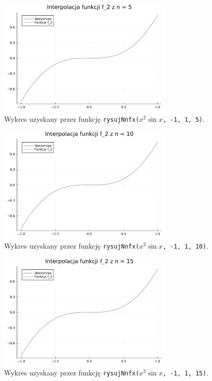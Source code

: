 \documentclass{article}
\begin{document}
\begin{figure}[H]
\centering
\includegraphics[width=0.75\textwidth]{task5_f2_n5.png}
\caption{Wykres uzyskany przez funkcję \texttt{rysujNnfx($x^2 \sin x$, -1, 1, 5)}.}
\end{figure}

\begin{figure}[H]
\centering
\includegraphics[width=0.75\textwidth]{task5_f2_n10.png}
\caption{Wykres uzyskany przez funkcję \texttt{rysujNnfx($x^2 \sin x$, -1, 1, 10)}.}
\end{figure}

\begin{figure}[H]
\centering
\includegraphics[width=0.75\textwidth]{task5_f2_n15.png}
\caption{Wykres uzyskany przez funkcję \texttt{rysujNnfx($x^2 \sin x$, -1, 1, 15)}.}
\end{figure}
\end{document}
